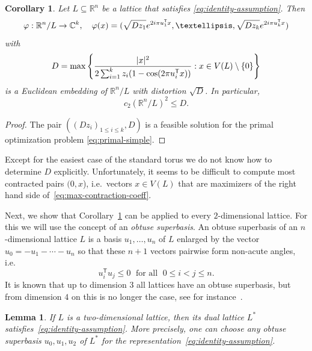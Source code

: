 \documentclass{amsart}
\newtheorem{lemma}[defin]{Lemma}
\newtheorem{corollary}[defin]{Corollary}
\newcommand{\C}{\mathbb{C}}
\newcommand{\R}{\mathbb{R}}
\begin{document}
\begin{corollary}
 \label{cor:general-embedding}
 Let $L \subseteq \R^n$ be a lattice that satisfies
 \eqref{eq:identity-assumption}.  Then
 \[
\varphi : \R^n/L \to \C^{k} ,  \quad
\varphi(x) = (\sqrt{D z_{1}} e^{2i\pi u_{1}^{\sf T}x}, \ldots, \sqrt{D z_{k}} e^{2i\pi
u_{k}^{\sf T}x})
\]
with
\begin{equation}
\label{eq:max-contraction-coeff}
D = \max\left\{
\frac{|x|^2}{2 \sum_{i = 1 }^k z_{i} (1- \cos(2\pi
  u_{i}^{\sf T}x))  } : x \in V(L)\setminus \{0\} \right\}
\end{equation}
is a Euclidean embedding of $\R^n /L$ with distortion
$\sqrt{D}$. In particular,
\begin{equation}
 \label{eq:lower-bound-from-general-construction}
c_2(\R^n /L)^2 \le D.
\end{equation}
\end{corollary}

\begin{proof}
  The pair $((Dz_{i})_{1 \le i \le k}, D)$ is a feasible solution for
  the primal optimization problem \eqref{eq:primal-simple}.
\end{proof}

Except for the easiest case of the standard torus we do not know how
to determine $D$ explicitly.  Unfortunately, it seems to be difficult
to compute most contracted pairs $(0,x$), i.e.\ vectors $x \in V(L)$
that are maximizers of the right hand side
of~\eqref{eq:max-contraction-coeff}.

\medskip

Next, we show that Corollary~\ref{cor:general-embedding} can be applied
to every $2$-dimensional lattice. For this we will use the concept of
an \emph{obtuse superbasis}. An obtuse superbasis of an
$n$-dimensional lattice $L$ is a basis $u_1, \ldots, u_n$ of $L$
enlarged by the vector $u_0 = -u_1 - \cdots - u_n$ so that these
$n + 1$ vectors pairwise form non-acute angles, i.e.\
\begin{equation}
 \label{eq:obtuse-superbase-cond}
 u_i^\mathsf{T} u_j \le 0 \; \text{ for all } \; 0 \leq i < j \leq
 n.
\end{equation}
It is known that up to dimension $3$ all lattices have an obtuse
superbasis, but from dimension $4$ on this is no longer the case, see
for instance~\cite{Conway1992}.

\begin{lemma}
  \label{lemma:id-decomp-for-2d-case}
  If $L$ is a two-dimensional lattice, then its dual lattice
  $L^*$ satisfies~\eqref{eq:identity-assumption}. More precisely, one can choose any obtuse superbasis $u_0,u_1,u_2$ of $L^*$ for
  the representation~\eqref{eq:identity-assumption}.
\end{lemma}
\end{document}
